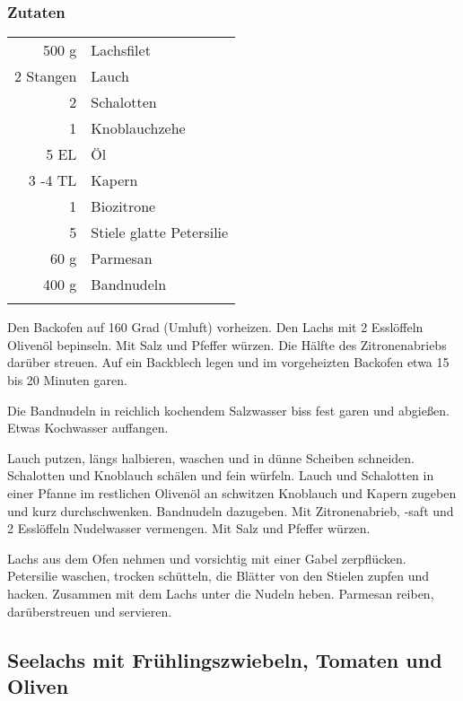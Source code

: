 \subsubsection*{Zutaten}
\begin{tabular}{r l}
        500 g & Lachsfilet                     \\
    2 Stangen & Lauch                          \\
            2 & Schalotten                     \\
            1 & Knoblauchzehe                  \\
         5 EL & Öl                             \\
      3 -4 TL & Kapern                         \\
            1 & Biozitrone                     \\
            5 & Stiele       glatte Petersilie \\
         60 g & Parmesan                       \\
        400 g & Bandnudeln                     \\
              & 
\end{tabular}

Den Backofen auf 160 Grad (Umluft) vorheizen. Den Lachs mit 2 Esslöffeln Olivenöl bepinseln.
Mit Salz und Pfeffer würzen. Die Hälfte des Zitronenabriebs darüber streuen. Auf ein Backblech
legen und im vorgeheizten Backofen etwa 15 bis 20 Minuten garen. 

Die Bandnudeln in reichlich kochendem Salzwasser biss fest garen und abgießen. Etwas Kochwasser auffangen.

Lauch putzen, längs halbieren, waschen und in dünne Scheiben schneiden. Schalotten und Knoblauch schälen und fein würfeln.
Lauch und Schalotten in einer Pfanne im restlichen Olivenöl an schwitzen Knoblauch und Kapern zugeben und kurz durchschwenken. Bandnudeln dazugeben. Mit Zitronenabrieb, -saft und 2 Esslöffeln Nudelwasser vermengen. Mit Salz und Pfeffer würzen.

Lachs aus dem Ofen nehmen und vorsichtig mit einer Gabel zerpflücken. Petersilie waschen, trocken schütteln, die Blätter von den Stielen zupfen und hacken. Zusammen mit dem Lachs unter die Nudeln heben. Parmesan reiben, darüberstreuen und servieren.



\subsection{Seelachs mit Frühlingszwiebeln, Tomaten und Oliven}\label{sec:SeeLachs:TomatenOliven}
